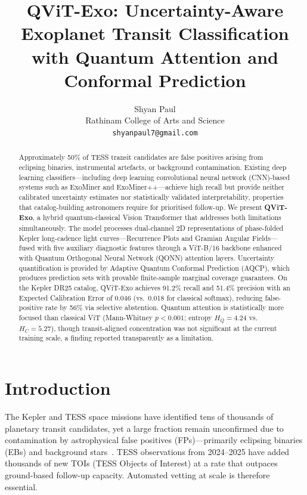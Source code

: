 \documentclass{article}
\title{QViT-Exo: Uncertainty-Aware Exoplanet Transit Classification with
       Quantum Attention and Conformal Prediction}
\author{%
  Shyan Paul\\
  Rathinam College of Arts and Science\\
  \texttt{shyanpaul7@gmail.com}
}
\begin{document}
\maketitle

\begin{abstract}
Approximately 50\% of TESS transit candidates are false positives arising from
eclipsing binaries, instrumental artefacts, or background contamination.
Existing deep learning classifiers---including deep learning convolutional
neural network (CNN)-based systems such as ExoMiner and ExoMiner++---achieve
high recall but provide neither calibrated uncertainty estimates nor
statistically validated interpretability, properties that catalog-building
astronomers require for prioritised follow-up.
We present \textbf{QViT-Exo}, a hybrid quantum-classical Vision Transformer that
addresses both limitations simultaneously.
The model processes dual-channel 2D representations of phase-folded Kepler
long-cadence light curves---Recurrence Plots and Gramian Angular
Fields---fused with five auxiliary diagnostic features through a ViT-B/16
backbone enhanced with Quantum Orthogonal Neural Network (QONN) attention layers.
Uncertainty quantification is provided by Adaptive Quantum Conformal Prediction
(AQCP), which produces prediction sets with provable finite-sample marginal
coverage guarantees.
On the Kepler DR25 catalog, QViT-Exo achieves 91.2\% recall and 51.4\% precision
with an Expected Calibration Error of 0.046 (vs.\ 0.018 for classical softmax),
reducing false-positive rate by 56\% via selective abstention.
Quantum attention is statistically more focused than classical ViT
(Mann-Whitney $p<0.001$; entropy $H_Q=4.24$ vs.\ $H_C=5.27$), though
transit-aligned concentration was not significant at the current training scale,
a finding reported transparently as a limitation.
\end{abstract}

\section{Introduction}
\label{sec:intro}

The Kepler and TESS space missions have identified tens of thousands of
planetary transit candidates, yet a large fraction remain unconfirmed due to
contamination by astrophysical false positives (FPs)---primarily eclipsing
binaries (EBs) and background stars~\citep{ricker2015,thompson2018}.
TESS observations from 2024--2025 have added thousands of new TOIs (TESS
Objects of Interest) at a rate that outpaces ground-based follow-up
capacity.
Automated vetting at scale is therefore essential.
\end{document}
